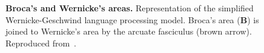 \begin{figure}[htbp]
	\centering

	\caption[Broca's and Wernicke's areas]{\textbf{Broca's and Wernicke's areas.}
	Representation of the simplified Wernicke-Geschwind language processing
	model.
	Broca's area (\textbf{B}) is joined to Wernicke's area by the arcuate
	fasciculus (brown arrow).
	Reproduced from~\citet{kandel.schwartz.jessel:2000}.}
	\label{fig:speech:wg}
\end{figure}
